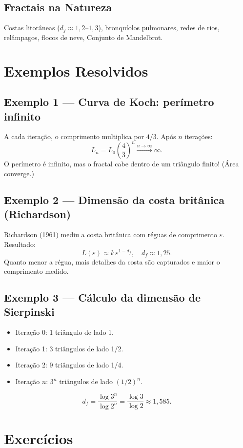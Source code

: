\documentclass[12pt,a4paper]{article}
\begin{document}
\subsection*{Fractais na Natureza}
Costas litor\^aneas ($d_f \approx 1{,}2$--$1{,}3$), bronqu\'iolos pulmonares, redes de rios, rel\^ampagos, flocos de neve, Conjunto de Mandelbrot.

\section*{Exemplos Resolvidos}

\subsection*{Exemplo 1 --- Curva de Koch: per\'imetro infinito}
A cada itera\c{c}\~ao, o comprimento multiplica por $4/3$. Ap\'os $n$ itera\c{c}\~oes:
\[
L_n = L_0 \left(\frac{4}{3}\right)^n \xrightarrow{n\to\infty} \infty.
\]
O per\'imetro \'e infinito, mas o fractal cabe dentro de um tri\^angulo finito! (\'Area converge.)

\subsection*{Exemplo 2 --- Dimens\~ao da costa brit\^anica (Richardson)}
Richardson (1961) mediu a costa brit\^anica com r\'eguas de comprimento $\varepsilon$. Resultado:
\[
L(\varepsilon) \approx k\,\varepsilon^{1-d_f}, \quad d_f \approx 1{,}25.
\]
Quanto menor a r\'egua, mais detalhes da costa s\~ao capturados e maior o comprimento medido.

\subsection*{Exemplo 3 --- C\'alculo da dimens\~ao de Sierpinski}
\begin{itemize}
  \item Itera\c{c}\~ao 0: 1 tri\^angulo de lado 1.
  \item Itera\c{c}\~ao 1: 3 tri\^angulos de lado 1/2.
  \item Itera\c{c}\~ao 2: 9 tri\^angulos de lado 1/4.
  \item Itera\c{c}\~ao $n$: $3^n$ tri\^angulos de lado $(1/2)^n$.
\end{itemize}
\[
d_f = \frac{\log 3^n}{\log 2^n} = \frac{\log 3}{\log 2} \approx 1{,}585.
\]

\section*{Exerc\'icios}
\end{document}
